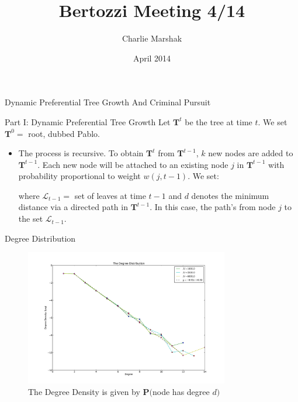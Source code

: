 \documentclass[xcolor=dvipsnames]{beamer}
\title{Bertozzi Meeting 4/14}
\author{Charlie Marshak}
\date{April 2014}
\newcommand{\bb}[1]{\textbf{#1}}
\begin{document}
\begin{frame}
\begin{large}
\begin{center}
Dynamic Preferential Tree Growth And Criminal Pursuit
\end{center}
\end{large}
\end{frame}

\begin{frame}{Part I: Dynamic Preferential Tree Growth}
Let $\bb T^t$ be the tree at time $t$. We set $\bb T^0 = $ root, dubbed Pablo.
\\

\begin{itemize}
\item The process is recursive.  To obtain $\bb T^t$ from $\bb T^{t-1}$, $k$ new nodes are added to $\bb T^{t-1}$.  Each new node will be attached to an existing node $j$ in $\bb T^{t-1}$ with probability proportional to weight $w(j, t-1)$.  We set:
\begin{center}
\end{center}
where $\mathcal{L}_{t-1} = $ set of leaves at time $t-1$ and $d$ denotes the minimum distance via a directed path in $\bb T^{t-1}$.  In this case, the path's from node $j$ to the set $\mathcal{L}_{t-1}$.
\end{itemize}

\end{frame}


\begin{frame}{Degree Distribution}

\begin{figure}
\includegraphics[width = 3.5in]{DDPEAKLog.pdf}
\caption{The Degree Density is given by $\bb P($node has degree $d)$}
\end{figure}
\end{frame}
\end{document}
